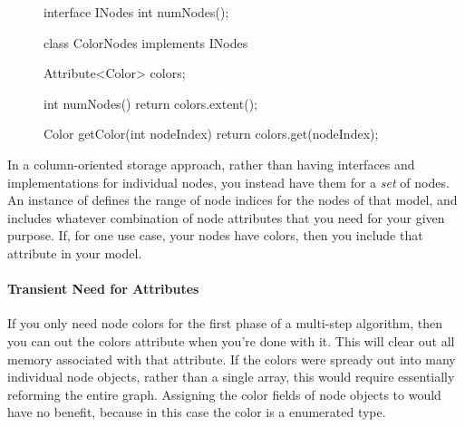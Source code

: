 \begin{figure}
\begin{framedlisting}
interface INodes {
  int numNodes();
}

class ColorNodes implements INodes {
  Attribute<Color> colors;
  
  int numNodes() {
    return colors.extent();
  }
  
  Color getColor(int nodeIndex) {
    return colors.get(nodeIndex);
  }
}
\end{framedlisting}
\end{figure}
In a column-oriented storage approach, rather than having interfaces and
implementations for individual nodes, you instead have them for a
\emph{set} of nodes. An instance of  
defines the range of node indices for the nodes of that model, and includes
whatever combination of node attributes that you need for your given purpose.
If, for one use case, your nodes have colors, then you include that attribute in
your  model.

\paragraph{Transient Need for Attributes}
If you only need node colors for the first phase of a multi-step algorithm, then
you can  out the colors attribute when you're done with it. This will
clear out all memory associated with that attribute. If the colors were spready
out into many individual node objects, rather than a single array, this would
require essentially reforming the entire graph. Assigning the color fields of
node objects to  would have no benefit, because in this case  the
color is a enumerated type.




